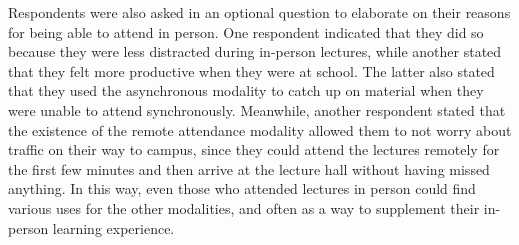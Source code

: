 Respondents were also asked in an optional question to elaborate on their reasons for being able to attend in person. One respondent indicated that they did so because they were less distracted during in-person lectures, while another stated that they felt more productive when they were at school. The latter also stated that they used the asynchronous modality to catch up on material when they were unable to attend synchronously. Meanwhile, another respondent stated that the existence of the remote attendance modality allowed them to not worry about traffic on their way to campus, since they could attend the lectures remotely for the first few minutes and then arrive at the lecture hall without having missed anything. In this way, even those who attended lectures in person could find various uses for the other modalities, and often as a way to supplement their in-person learning experience.

